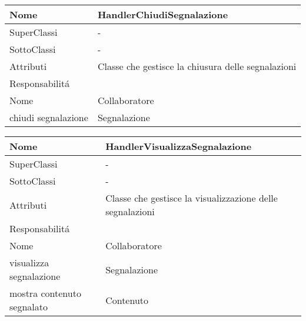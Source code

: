 \begin{center}
    \begin{tabular}{ |p{3cm}|p{3cm}|p{3cm}|p{3cm}| }
        \hline
        Nome & \multicolumn{3}{|p{9cm}|}{HandlerChiudiSegnalazione} \\\hline
        SuperClassi & \multicolumn{3}{|p{9cm}|}{-} \\\hline
        SottoClassi & \multicolumn{3}{|p{9cm}|}{-} \\\hline
        Attributi & \multicolumn{3}{|p{9cm}|}{Classe che gestisce la chiusura delle segnalazioni} \\\hline
        \multicolumn{4}{|p{12cm}|}{Responsabilit\'a} \\\hline
        \multicolumn{2}{|p{6cm}|}{Nome} & \multicolumn{2}{|p{6cm}|}{Collaboratore} \\\hline
        \multicolumn{2}{|p{6cm}|}{chiudi segnalazione} & \multicolumn{2}{|p{6cm}|}{Segnalazione} \\\hline
    \end{tabular}
\end{center}

\begin{center}
    \begin{tabular}{ |p{3cm}|p{3cm}|p{3cm}|p{3cm}| }
        \hline
        Nome & \multicolumn{3}{|p{9cm}|}{HandlerVisualizzaSegnalazione} \\\hline
        SuperClassi & \multicolumn{3}{|p{9cm}|}{-} \\\hline
        SottoClassi & \multicolumn{3}{|p{9cm}|}{-} \\\hline
        Attributi & \multicolumn{3}{|p{9cm}|}{Classe che gestisce la visualizzazione delle segnalazioni} \\\hline
        \multicolumn{4}{|p{12cm}|}{Responsabilit\'a} \\\hline
        \multicolumn{2}{|p{6cm}|}{Nome} & \multicolumn{2}{|p{6cm}|}{Collaboratore} \\\hline
        \multicolumn{2}{|p{6cm}|}{visualizza segnalazione} & \multicolumn{2}{|p{6cm}|}{Segnalazione} \\\hline
        \multicolumn{2}{|p{6cm}|}{mostra contenuto segnalato} & \multicolumn{2}{|p{6cm}|}{Contenuto} \\\hline
    \end{tabular}
\end{center}

